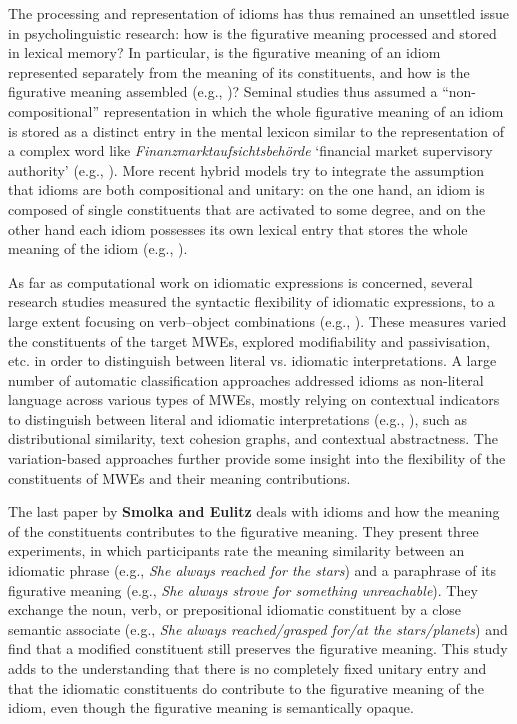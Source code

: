\documentclass[output=paper]{langsci/langscibook}
\begin{document}
The processing and representation of idioms has thus remained an
unsettled issue in psycholinguistic research: how is the figurative
meaning processed and stored in lexical memory? In particular, is the
figurative meaning of an idiom represented separately from the meaning
of its constituents, and how is the figurative meaning assembled
(e.g., \citealt{Cacciari/Tabossi:88, Gibbs:92, Cacciari/Glucksberg:94,
  Titone/Connine:99, Hamblin/Gibbs:03})? Seminal studies thus assumed
a ``non-compositional'' representation in which the whole figurative
meaning of an idiom is stored as a distinct entry in the mental
lexicon similar to the representation of a complex word like
\textit{Finanzmarktaufsichtsbehörde} `financial market supervisory
authority' (e.g., \citealt{Bobrow/Bell:73, Swinney/Cutler:79,
  Gibbs:80}). More recent hybrid models try to integrate the
assumption that idioms are both compositional and unitary: on the one
hand, an idiom is composed of single constituents that are
activated to some degree, and on the other hand each idiom possesses
its own lexical entry that stores the whole meaning of the idiom
(e.g., \citealt{Cacciari/Tabossi:88, GibbsEtAl:89, Cutting/Bock:97,
  Titone/Connine:99, SprengerEtAl:06, Caillies/Butcher:07,
  Holsinger/Kaiser:13, Titone/Libben:14}).

As far as computational work on idiomatic expressions is concerned,
several research studies measured the syntactic flexibility of
idiomatic expressions, to a large extent focusing on verb--object
combinations (e.g., \citealt{Bannard:07,FazlyEtAl:09}). These measures
varied the constituents of the target MWEs, explored modifiability and
passivisation, etc. in order to distinguish between literal
vs. idiomatic interpretations. A large number of automatic
classification approaches addressed idioms as non-literal language across various types of MWEs, mostly relying on
contextual indicators to distinguish between literal and idiomatic
interpretations (e.g.,
\citealt{Sporleder/Li:09,TurneyEtAl:11,Koeper/SchulteImWalde:16b}),
such as distributional similarity, text cohesion graphs, and
contextual abstractness. The variation-based approaches further
provide some insight into the flexibility of the constituents of MWEs and
their meaning contributions.

The last paper by \textbf{Smolka and Eulitz} deals with idioms and how
the meaning of the constituents contributes to the figurative meaning. They
present three experiments, in which participants rate the meaning
similarity between an idiomatic phrase (e.g., \textit{She always
  reached for the stars}) and a paraphrase of its figurative meaning
(e.g., \textit{She always strove for something unreachable}). They
exchange the noun, verb, or prepositional idiomatic constituent by a
close semantic associate (e.g., \textit{She always reached/grasped
  for/at the stars/planets}) and find that a modified constituent
still preserves the figurative meaning. This study adds to the
understanding that there is no completely fixed unitary entry and
that the idiomatic constituents do contribute to the figurative
meaning of the idiom, even though the figurative meaning is
semantically opaque.
\end{document}

